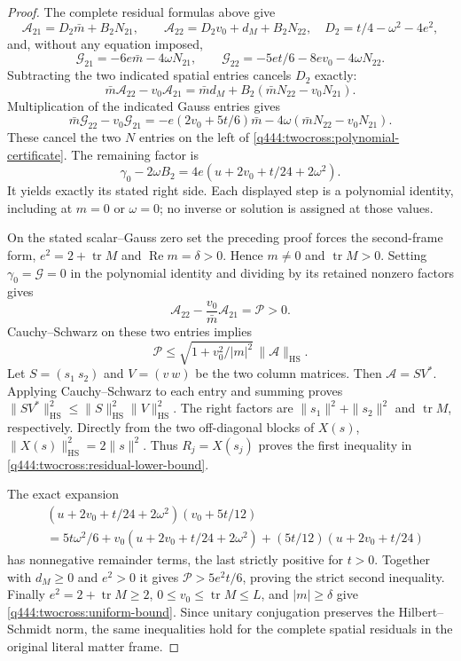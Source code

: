 \begin{proof}
The complete residual formulas above give
\[
 \mathcal A_{21}=D_2\bar m+B_2N_{21},\qquad
 \mathcal A_{22}=D_2v_0+d_M+B_2N_{22},\quad
 D_2=t/4-\omega^2-4e^2,
\]
and, without any equation imposed,
\[
 \mathcal G_{21}=-6e\bar m-4\omega N_{21},\qquad
 \mathcal G_{22}=-5et/6-8ev_0-4\omega N_{22}.
\]
Subtracting the two indicated spatial entries cancels $D_2$ exactly:
\[
 \bar m\mathcal A_{22}-v_0\mathcal A_{21}
 =\bar m d_M+B_2(\bar mN_{22}-v_0N_{21}).
\]
Multiplication of the indicated Gauss entries gives
\[
 \bar m\mathcal G_{22}-v_0\mathcal G_{21}
 =-e(2v_0+5t/6)\bar m
      -4\omega(\bar mN_{22}-v_0N_{21}).
\]
These cancel the two $N$ entries on the left of
\eqref{q444:twocross:polynomial-certificate}. The remaining factor is
\[
 \gamma_0-2\omega B_2
 =4e(u+2v_0+t/24+2\omega^2).
\]
It yields exactly its stated right side. Each displayed step is a
polynomial identity, including at $m=0$ or $\omega=0$; no inverse or
solution is assigned at those values.

On the stated scalar--Gauss zero set the preceding proof forces the
second-frame form, $e^2=2+\operatorname{tr}M$ and
$\operatorname{Re}m=\delta>0$. Hence $m\ne0$ and
$\operatorname{tr}M>0$. Setting $\gamma_0=\mathcal G=0$ in the
polynomial identity and dividing by its retained nonzero factors gives
\[
 \mathcal A_{22}-\frac{v_0}{\bar m}\mathcal A_{21}
 =\mathcal P>0.
\]
Cauchy--Schwarz on these two entries implies
\[
 \mathcal P\leq
  \sqrt{1+v_0^2/|m|^2}\,\|\mathcal A\|_{\mathrm{HS}}.
\]
Let $S=(s_1\ s_2)$ and $V=(v\ w)$ be the two column matrices.
Then $\mathcal A=SV^*$. Applying Cauchy--Schwarz to each entry and
summing proves $\|SV^*\|_{\mathrm{HS}}^2
\leq\|S\|_{\mathrm{HS}}^2\|V\|_{\mathrm{HS}}^2$.
The right factors are $\|s_1\|^2+\|s_2\|^2$ and
$\operatorname{tr}M$, respectively. Directly from the two off-diagonal
blocks of $X(s)$, $\|X(s)\|_{\mathrm{HS}}^2=2\|s\|^2$.
Thus $R_j=X(s_j)$ proves the first inequality in
\eqref{q444:twocross:residual-lower-bound}.

The exact expansion
\begin{align*}
 &(u+2v_0+t/24+2\omega^2)(v_0+5t/12)\\
 &=5t\omega^2/6
   +v_0(u+2v_0+t/24+2\omega^2)
   +(5t/12)(u+2v_0+t/24)
\end{align*}
has nonnegative remainder terms, the last strictly positive for $t>0$.
Together with $d_M\geq0$ and $e^2>0$ it gives
$\mathcal P>5e^2t/6$, proving the strict second inequality.
Finally $e^2=2+\operatorname{tr}M\geq2$,
$0\leq v_0\leq\operatorname{tr}M\leq L$, and $|m|\geq\delta$
give \eqref{q444:twocross:uniform-bound}. Since unitary conjugation
preserves the Hilbert--Schmidt norm, the same inequalities hold for
the complete spatial residuals in the original literal matter frame.
\end{proof}


